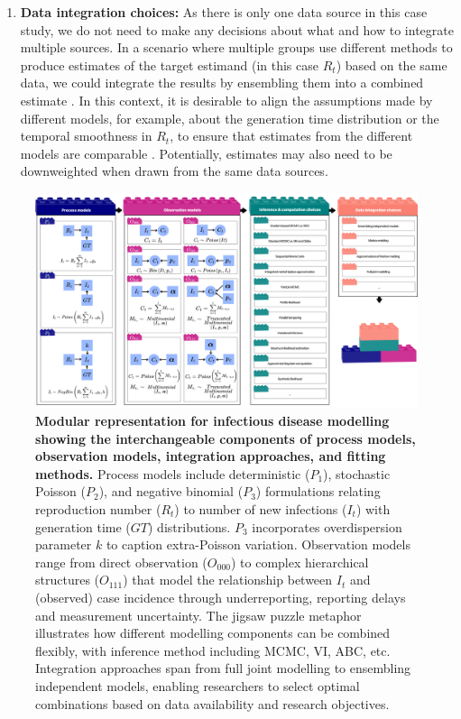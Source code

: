 \documentclass{article}
\begin{document}
\begin{enumerate}
\item \textbf{Data integration choices:} As there is only one data source in this case study, we do not need to make any decisions about what and how to integrate multiple sources. In a scenario where multiple groups use different methods to produce estimates of the target estimand (in this case $R_t$) based on the same data, we could integrate the results by ensembling them into a combined estimate \citep{maishman2022statistical,manley2024combining}. In this context, it is desirable to align the assumptions made by different models, for example, about the generation time distribution or the temporal smoothness in $R_t$, to ensure that estimates from the different models are comparable \citep{brockhaus2023why}. Potentially, estimates may also need to be downweighted when drawn from the same data sources.

 \end{enumerate}
 


\begin{figure}[htbp]
    \centering
    \includegraphics[width=\textwidth]{figures/Abbott et al figure 6.png}
    \caption{\textbf{Modular representation for infectious disease modelling showing the interchangeable components of process models, observation models, integration approaches, and fitting methods.} Process models include deterministic ($P_1$), stochastic Poisson ($P_2$), and negative binomial ($P_3$) formulations relating reproduction number ($R_t$) to number of new infections ($I_t$) with generation time ($GT$) distributions. $P_3$ incorporates overdispersion parameter $k$ to caption extra-Poisson variation. Observation models range from direct observation ($O_{000}$) to complex hierarchical structures ($O_{111}$) that model the relationship between $I_t$ and (observed) case incidence through underreporting, reporting delays and measurement uncertainty. The jigsaw puzzle metaphor illustrates how different modelling components can be combined flexibly, with inference method including MCMC, VI, ABC, etc. Integration approaches span from full joint modelling to ensembling independent models, enabling researchers to select optimal combinations based on data availability and research objectives. }
    \label{fig:case_study_visual}
\end{figure}
\end{document}
